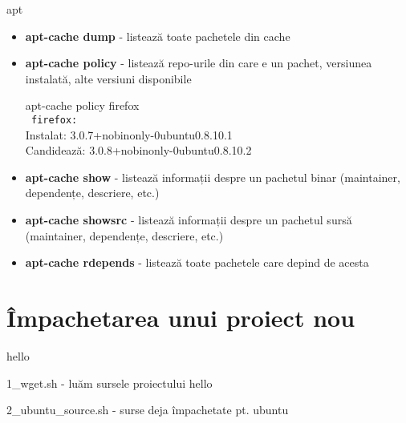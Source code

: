 \documentclass{beamer}
\begin{document}
\begin{frame}{apt}
  \begin{itemize}
  \item \textbf{apt-cache dump} - listează toate pachetele din cache
  \item \textbf{apt-cache policy} - listează repo-urile din care e un pachet, versiunea instalată, alte versiuni disponibile
    \begin{beamerboxesrounded}[lower=block body,shadow=true,width=8cm]{}
      apt-cache policy firefox \\
      \texttt{   firefox:}\\
      Instalat: 3.0.7+nobinonly-0ubuntu0.8.10.1 \\
      Candidează: 3.0.8+nobinonly-0ubuntu0.8.10.2
    \end{beamerboxesrounded}
  \item \textbf{apt-cache show} - listează informații despre un pachetul binar (maintainer, dependențe, descriere, etc.)
  \item \textbf{apt-cache showsrc} - listează informații despre un pachetul sursă (maintainer, dependențe, descriere, etc.)
  \item \textbf{apt-cache rdepends} - listează toate pachetele care depind de acesta
  \end{itemize}
\end{frame}


\section{Împachetarea unui proiect nou}
\frame{\tableofcontents[currentsection]}

\begin{frame}{hello}
  \begin{beamerboxesrounded}[lower=block body,shadow=true]{1\_wget.sh - luăm sursele proiectului hello}
    \small 
  \end{beamerboxesrounded}

  \begin{beamerboxesrounded}[lower=block body,shadow=true]{2\_ubuntu\_source.sh - surse deja împachetate pt. ubuntu}
    \small 
  \end{beamerboxesrounded}
\end{frame}
\end{document}
